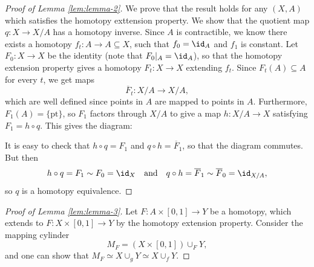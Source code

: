 \begin{proof}[Proof of Lemma \ref{lem:lemma-2}]
  We prove that the result holds for any $(X, A)$
  which satisfies the homotopy exttension property.
  We show that the quotient map $q : X \to X / A$
  has a homotopy inverse. Since $A$ is contractible,
  we know there exists a homotopy $f_t : A \to A \subseteq X$,
  such that $f_0 = \id_A$ and $f_1$ is constant.
  Let $F_0 : X \to X$ be the identity (note that
  $F_0|_A = \id_A$), so that the homotopy extension
  property gives a homotopy
  $F_t : X \to X$ extending $f_t$.
  Since $F_t(A) \subseteq A$ for every $t$, we get maps
  \[
    \overline{F}_t : X / A \to X / A,
  \]
  which are well defined since points in $A$ are mapped
  to points in $A$. Furthermore, $F_1(A) = \{\text{pt}\}$,
  so $F_1$ factors through $X / A$ to give a map
  $h : X / A \to X$ satisfying $F_1 = h \circ q$. This
  gives the diagram:
  \begin{center}
  \end{center}
  It is easy to check that $h \circ q = F_1$ and
  $q \circ h = \overline{F}_1$, so that the
  diagram commutes. But then
  \[
    h \circ q = F_1 \sim F_0 = \id_X \quad \text{and} \quad
    q \circ h = \overline{F}_1 \sim \overline{F}_0 = \id_{X / A},
  \]
  so $q$ is a homotopy equivalence.
\end{proof}

\begin{proof}[Proof of Lemma \ref{lem:lemma-3}]
  Let $F : A \times [0, 1] \to Y$ be a homotopy,
  which extends to $F : X \times [0, 1] \to Y$
  by the homotopy extension property. Consider
  the mapping cylinder
  \[
    M_F = (X \times [0, 1]) \cup_F Y,
  \]
  and one can show that
  $M_F \simeq X \cup_g Y \simeq X \cup_f Y$.
\end{proof}
